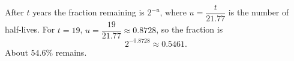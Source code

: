After $t$ years the fraction remaining is $2^{-u}$, where $u=\dfrac{t}{21.77}$ is the number of half-lives. For $t=19$, $u=\dfrac{19}{21.77}\approx0.8728$, so the fraction is
\[2^{-0.8728}\approx0.5461.\]
About $\boxed{54.6\%}$ remains.
